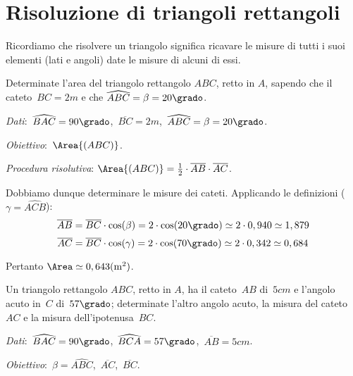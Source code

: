 \ovalbox{\risolvi \ref{ese:G.6}}

\section{Risoluzione di triangoli rettangoli}

Ricordiamo che risolvere un triangolo significa ricavare le misure di tutti i suoi elementi (lati e angoli) date le misure di alcuni di essi.

\begin{exrig}
 \begin{esempio}
Determinate l'area del triangolo rettangolo $ABC$, retto in $A$, sapendo che il cateto~${BC}=2\unit{m}$ e che $\widehat{ABC}=\beta=20\grado$.

\emph{Dati}:~$\widehat{BAC}=90\grado$,\quad~$\overline{BC}=2\unit{m}$,\quad~$\widehat{ABC}=\beta=20\grado$.

\emph{Obiettivo}:~$\Area{(ABC)}$.

\emph{Procedura risolutiva}:
$\Area{(ABC)}=\frac{1}{2}\cdot \overline{AB}\cdot \overline{AC}$.

Dobbiamo dunque determinare le misure dei cateti. Applicando le definizioni ($\gamma=\widehat{ACB}$):
\[\overline{AB}=\overline{BC}\cdot {\cos(\beta)}=2\cdot {\cos(20\grado)}\simeq 2\cdot 0,940\simeq 1,879\]
\[\overline{AC}=\overline{BC}\cdot {\cos(\gamma)}=2\cdot {\cos(70\grado)}\simeq 2\cdot 0,342\simeq 0,684\]

Pertanto $\Area\simeq 0,643\unit{(m^{2})}$.
 \end{esempio}

 \begin{esempio}
Un triangolo rettangolo $ABC$, retto in $A$, ha il cateto~$AB$ di~$5\unit{cm}$ e l'angolo acuto in~$C$ di~$57\grado$; determinate l'altro angolo acuto,
la misura del cateto~$AC$ e la misura dell'ipotenusa~$BC$.

\emph{Dati}:~$\widehat{BAC}=90\grado$,\quad~$\widehat{BCA}=57\grado$,\quad~$\overline{AB}=5\unit{cm}$.

\emph{Obiettivo}:~$\beta=\widehat{ABC}$,\quad~$\overline{AC}$,\quad~$\overline{BC}$.


\end{esempio}
\end{exrig}

